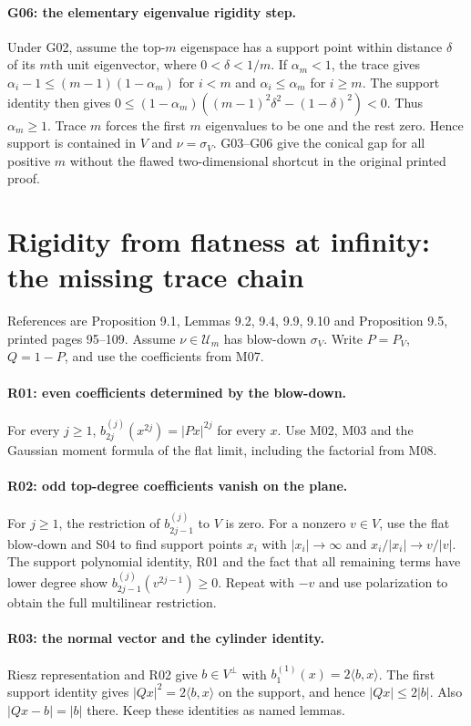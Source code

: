 \paragraph{G06: the elementary eigenvalue rigidity step.}
Under G02, assume the top-$m$ eigenspace has a support point within distance
$\delta$ of its $m$th unit eigenvector, where $0<\delta<1/m$.
If $\alpha_m<1$, the trace gives
$\alpha_i-1\leq(m-1)(1-\alpha_m)$ for $i<m$ and
$\alpha_i\leq\alpha_m$ for $i\geq m$.
The support identity then gives
$0\leq(1-\alpha_m)((m-1)^2\delta^2-(1-\delta)^2)<0$.
Thus $\alpha_m\geq1$. Trace $m$ forces the first $m$ eigenvalues to be one
and the rest zero. Hence support is contained in $V$ and $\nu=\sigma_V$.
G03--G06 give the conical gap for all positive $m$ without the flawed
two-dimensional shortcut in the original printed proof.

\section{Rigidity from flatness at infinity: the missing trace chain}
References are Proposition 9.1, Lemmas 9.2, 9.4, 9.9, 9.10 and Proposition
9.5, printed pages 95--109. Assume $\nu\in\mathcal U_m$ has blow-down
$\sigma_V$. Write $P=P_V$, $Q=1-P$, and use the coefficients from M07.

\paragraph{R01: even coefficients determined by the blow-down.}
For every $j\geq1$, $b_{2j}^{(j)}(x^{2j})=|Px|^{2j}$ for every $x$.
Use M02, M03 and the Gaussian moment formula of the flat limit, including the
factorial from M08.

\paragraph{R02: odd top-degree coefficients vanish on the plane.}
For $j\geq1$, the restriction of $b_{2j-1}^{(j)}$ to $V$ is zero.
For a nonzero $v\in V$, use the flat blow-down and S04 to find support points
$x_i$ with $|x_i|\to\infty$ and $x_i/|x_i|\to v/|v|$.
The support polynomial identity, R01 and the fact that all remaining terms have
lower degree show $b_{2j-1}^{(j)}(v^{2j-1})\geq0$.
Repeat with $-v$ and use polarization to obtain the full multilinear restriction.

\paragraph{R03: the normal vector and the cylinder identity.}
Riesz representation and R02 give $b\in V^\perp$ with
$b_1^{(1)}(x)=2\langle b,x\rangle$. The first support identity gives
$|Qx|^2=2\langle b,x\rangle$ on the support, and hence $|Qx|\leq2|b|$.
Also $|Qx-b|=|b|$ there. Keep these identities as named lemmas.

